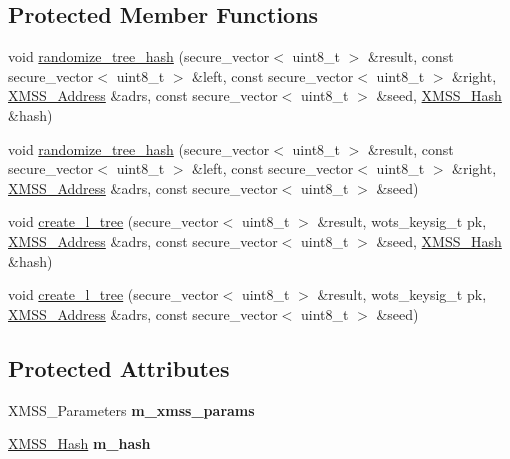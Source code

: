 \subsection*{Protected Member Functions}
\begin{DoxyCompactItemize}
\item 
void \hyperlink{class_botan_1_1_x_m_s_s___common___ops_a5d08646c7fbf2462ecea2e204ca63d8f}{randomize\+\_\+tree\+\_\+hash} (secure\+\_\+vector$<$ uint8\+\_\+t $>$ \&result, const secure\+\_\+vector$<$ uint8\+\_\+t $>$ \&left, const secure\+\_\+vector$<$ uint8\+\_\+t $>$ \&right, \hyperlink{class_botan_1_1_x_m_s_s___address}{X\+M\+S\+S\+\_\+\+Address} \&adrs, const secure\+\_\+vector$<$ uint8\+\_\+t $>$ \&seed, \hyperlink{class_botan_1_1_x_m_s_s___hash}{X\+M\+S\+S\+\_\+\+Hash} \&hash)
\item 
void \hyperlink{class_botan_1_1_x_m_s_s___common___ops_ac2b7faff80249b5ddcd32eb634bb20f8}{randomize\+\_\+tree\+\_\+hash} (secure\+\_\+vector$<$ uint8\+\_\+t $>$ \&result, const secure\+\_\+vector$<$ uint8\+\_\+t $>$ \&left, const secure\+\_\+vector$<$ uint8\+\_\+t $>$ \&right, \hyperlink{class_botan_1_1_x_m_s_s___address}{X\+M\+S\+S\+\_\+\+Address} \&adrs, const secure\+\_\+vector$<$ uint8\+\_\+t $>$ \&seed)
\item 
void \hyperlink{class_botan_1_1_x_m_s_s___common___ops_a9c24984fc8983bab2106a3e702d02c91}{create\+\_\+l\+\_\+tree} (secure\+\_\+vector$<$ uint8\+\_\+t $>$ \&result, wots\+\_\+keysig\+\_\+t pk, \hyperlink{class_botan_1_1_x_m_s_s___address}{X\+M\+S\+S\+\_\+\+Address} \&adrs, const secure\+\_\+vector$<$ uint8\+\_\+t $>$ \&seed, \hyperlink{class_botan_1_1_x_m_s_s___hash}{X\+M\+S\+S\+\_\+\+Hash} \&hash)
\item 
void \hyperlink{class_botan_1_1_x_m_s_s___common___ops_a45991edc4a92109d244554308f0fa051}{create\+\_\+l\+\_\+tree} (secure\+\_\+vector$<$ uint8\+\_\+t $>$ \&result, wots\+\_\+keysig\+\_\+t pk, \hyperlink{class_botan_1_1_x_m_s_s___address}{X\+M\+S\+S\+\_\+\+Address} \&adrs, const secure\+\_\+vector$<$ uint8\+\_\+t $>$ \&seed)
\end{DoxyCompactItemize}
\subsection*{Protected Attributes}
\begin{DoxyCompactItemize}
\item 
\mbox{\label{class_botan_1_1_x_m_s_s___common___ops_a2ab57893ec6edbf79546a25ab5379c2e}} 
X\+M\+S\+S\+\_\+\+Parameters {\bfseries m\+\_\+xmss\+\_\+params}
\item 
\mbox{\label{class_botan_1_1_x_m_s_s___common___ops_a0a2b4ada89acec57b4c05125ca79e0b9}} 
\hyperlink{class_botan_1_1_x_m_s_s___hash}{X\+M\+S\+S\+\_\+\+Hash} {\bfseries m\+\_\+hash}
\end{DoxyCompactItemize}


